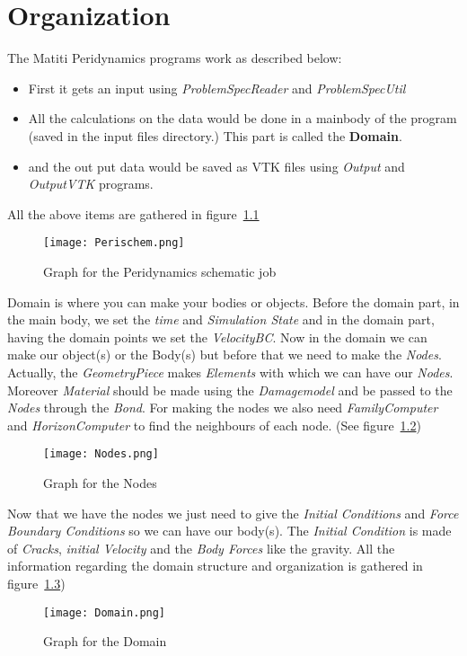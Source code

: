 \documentclass[11pt,fleqn]{book} %
\begin{document}
\chapter{Organization}
\label{chap:Organization}

The Matiti Peridynamics programs work as described below:
\begin{itemize}
\item First it gets an input using \emph{ProblemSpecReader} and \emph{ProblemSpecUtil}
\item All the calculations on the data would be done in a mainbody of the program (saved in the input files directory.) This part is called the \textbf{Domain}.
\item and the out put data would be saved as VTK files using \emph{Output} and \emph{OutputVTK} programs. 
\end{itemize}

All the above items are gathered in figure~\ref{fig:Perischem}
\begin{figure}
  \texttt{[image: Perischem.png]}
  \caption{Graph for the Peridynamics schematic job}
  \label{fig:Perischem}
\end{figure}

Domain is where you can make your bodies or objects. Before the domain part, in the main body, we set the \emph{time} and \emph{Simulation State} and in the domain part, having the domain points we set the \emph{VelocityBC}. Now in the domain we can make our object(s) or the Body(s) but before that we need to make the \emph{Nodes}. \\
Actually, the \emph{GeometryPiece} makes \emph{Elements} with which we can have our \emph{Nodes}. Moreover \emph{Material} should be made using the \emph{Damagemodel} and be passed to the \emph{Nodes} through the \emph{Bond}. For making the nodes we also need \emph{FamilyComputer} and \emph{HorizonComputer} to find the neighbours of each node. (See figure~\ref{fig:Nodes})
\begin{figure}
  \texttt{[image: Nodes.png]}
  \caption{Graph for the Nodes}
  \label{fig:Nodes}
\end{figure}

Now that we have the nodes we just need to give the \emph{Initial Conditions} and \emph{Force Boundary Conditions} so we can have our body(s). The \emph{Initial Condition} is made of \emph{Cracks}, \emph{initial Velocity} and the \emph{Body Forces} like the gravity.
All the information regarding the domain structure and organization is gathered in figure~\ref{fig:Domain})
\begin{figure}
  \texttt{[image: Domain.png]}
  \caption{Graph for the Domain}
  \label{fig:Domain}
\end{figure}

  
\end{document}

